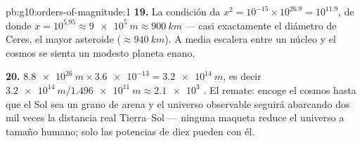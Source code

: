 \begin{solution}{pb:g10:orders-of-magnitude:1}
\textbf{19.} La condición da
$x^{2} = 10^{-15} \times 10^{26.9} = 10^{11.9}$, de donde
$x = 10^{5.95} \approx \qty{9e5}{m} \approx \qty{900}{km}$ --- casi
exactamente el diámetro de Ceres, el mayor asteroide
($\approx \qty{940}{km}$). A media escalera entre un núcleo y el cosmos
se sienta un modesto planeta enano.

\textbf{20.} $\qty{8.8e26}{m} \times \num{3.6e-13} = \qty{3.2e14}{m}$,
es decir $\qty{3.2e14}{m}/\qty{1.496e11}{m} \approx \num{2.1e3}$
. El remate: encoge el cosmos hasta que el Sol sea
un grano de arena y el universo observable seguirá abarcando dos mil
veces la distancia real Tierra--Sol --- ninguna maqueta reduce el
universo a tamaño humano; solo las potencias de diez pueden con él.
\end{solution}
